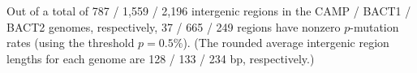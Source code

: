 Out of a total of 787 / 1,559 / 2,196 intergenic regions in the CAMP / BACT1 / BACT2 genomes, respectively, 37 / 665 / 249 regions have nonzero $p$-mutation rates (using the threshold $p=0.5\%$). (The rounded average intergenic region lengths for each genome are 128 / 133 / 234 bp, respectively.)\endinput